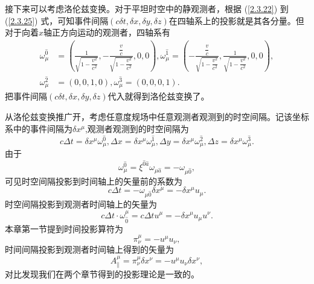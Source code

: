 \documentclass[11pt, a4paper, oneside, onecolumn]{ctexart}
\numberwithin{equation}{subsection}
\begin{document}
接下来可以考虑洛伦兹变换。对于平坦时空中的静观测者，根据 (\ref{2.3.22}) 到 (\ref{2.3.25}) 式，可知事件间隔$\left(c\delta{}t,\delta{}x,\delta{}y,\delta{}z\right)$在四轴系上的投影就是其各分量。但对于向着$x$轴正方向运动的观测者，四轴系有
\begin{align}
\omega^{\hat{0}}_{\mu}&=\left(\frac{1}{\sqrt{1-\dfrac{v^{2}}{c^{2}}}},-\frac{\dfrac{v}{c}}{\sqrt{1-\dfrac{v^{2}}{c^{2}}}},0,0\right),\omega^{\hat{1}}_{\mu}=\left(-\frac{\dfrac{v}{c}}{\sqrt{1-\dfrac{v^{2}}{c^{2}}}},\frac{1}{\sqrt{1-\dfrac{v^{2}}{c^{2}}}},0,0\right),\\
\omega^{\hat{2}}_{\mu}&=\left(0,0,1,0\right),\omega^{\hat{3}}_{\mu}=\left(0,0,0,1\right).
\end{align}
把事件间隔$\left(c\delta{}t,\delta{}x,\delta{}y,\delta{}z\right)$代入就得到洛伦兹变换了。

从洛伦兹变换推广开，考虑任意度规场中任意观测者观测到的时空间隔。记该坐标系中的事件间隔为$\delta{}x^{\mu}$,观测者观测到的时空间隔为
\begin{equation}
c\Delta{}t=\delta{}x^{\mu}\omega_{\mu}^{\hat{0}},\Delta{}x=\delta{}x^{\mu}\omega_{\mu}^{\hat{1}},\Delta{}y=\delta{}x^{\mu}\omega_{\mu}^{\hat{2}},\Delta{}z=\delta{}x^{\mu}\omega_{\mu}^{\hat{3}}.
\end{equation}
由于
\begin{equation}
\omega_{\mu}^{\hat{0}}=\xi^{\hat{0}\hat{a}}\omega_{\mu\hat{a}}=-\omega_{\mu\hat{0}},
\end{equation}
可见时空间隔投影到时间轴上的矢量前的系数为
\begin{equation}
c\Delta{}t=-\omega_{\mu\hat{0}}\delta{}x^{\mu}=-\delta{}x^{\mu}u_{\mu}.
\end{equation}
时空间隔投影到观测者时间轴上的矢量为
\begin{equation}
c\Delta{}t\cdot\omega^{\mu}_{\hat{0}}=c\Delta{}tu^{\mu}=-\delta{}x^{\mu}u_{\mu}u^{\nu}.
\end{equation}
本章第一节提到时间投影算符为
\begin{equation}
\pi^{\mu}_{\nu}=-u^{\mu}u_{\nu},
\end{equation}
时间间隔投影到观测者时间轴上得到的矢量为
\begin{equation}
A^{\mu}_{\parallel}=\pi^{\mu}_{\nu}\delta{}x^{\nu}=-u^{\mu}u_{\nu}\delta{}x^{\nu},
\end{equation}
对比发现我们在两个章节得到的投影理论是一致的。
\end{document}
